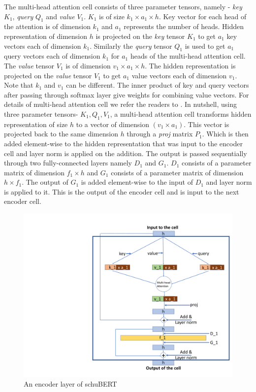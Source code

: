 \documentclass[11pt,a4paper]{article}
\begin{document}
The multi-head attention cell consists of three parameter tensors, namely - {\em key} $K_1$, {\em query} $Q_1$ and {\em value} $V_1$. $K_1$ is of size $k_1\times a_1 \times h$. Key vector for each head of the attention is of dimension $k_1$ and $a_1$ represents the number of heads. Hidden representation of dimension $h$ is projected on the {\em key} tensor $K_1$ to get $a_1$ key vectors each of dimension $k_1$. Similarly the {\em query} tensor $Q_1$ is used to get $a_1$ query vectors each of dimension $k_1$ for $a_1$ heads of the multi-head attention cell. The {\em value} tensor $V_1$ is of dimension $v_1 \times a_1 \times h$. The hidden representation is projected on the {\em value} tensor $V_1$ to get $a_1$ value vectors each of dimension $v_1$. Note that $k_1$ and $v_1$ can be different. The inner product of key and query vectors after passing through softmax layer give weights for combining value vectors. For details of multi-head attention cell we refer the readers to \citet{vaswani2017attention}. In nutshell, using three parameter tensors- $K_1, Q_1, V_1$, a multi-head attention cell transforms hidden representation of size $h$ to a vector of dimension $(v_1\times a_1)$. This vector is projected back to the same dimension $h$ through a {\em proj} matrix $P_1$. Which is then added element-wise to the hidden representation that was input to the encoder cell and layer norm is applied on the addition. The output is passed sequentially through two fully-connected layers namely $D_1$ and $G_1$.  $D_1$ consists of a parameter matrix of dimension $f_1 \times h$ and $G_1$ consists of a parameter matrix of dimension $h \times f_1$. The output of $G_1$ is added element-wise to the input of $D_1$ and layer norm is applied to it. This is the output of the encoder cell and is input to the next encoder cell. 
\begin{figure}[h]
\centering
\includegraphics[scale=0.2]{bert_architecture_2}
\caption{An encoder layer of schuBERT}
\label{fig:bert2}
\end{figure}
\end{document}
